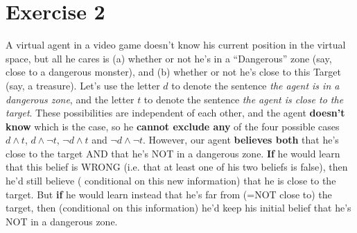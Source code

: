 \documentclass[leqno]{article}
\begin{document}
\section*{Exercise 2}

A virtual agent in a video game doesn't know his current position in the 
virtual space, but all he cares is (a) whether or not he's in a ``Dangerous''
zone (say, close to a dangerous monster), and (b) whether or not he's close to 
this Target (say, a treasure). Let's use the letter $d$ to denote the sentence 
\textit{the agent is in a dangerous zone}, and the letter $t$ to denote the 
sentence \textit{the agent is close to the target}. These possibilities are 
independent of each other, and the agent \textbf{doesn't know} which is the 
case, so he \textbf{cannot exclude any} of the four possible cases $d \land t$,
 $d \land \neg t$, $\neg d \land t$ and $\neg d \land \neg t$. However, our 
agent \textbf{believes both} that he's close to the target AND that he's NOT in
 a dangerous zone. \textbf{If} he would learn that this belief is WRONG (i.e. 
that at least one of his two beliefs is false), then he'd still believe (
conditional on this new information) that he is close to the target. But 
\textbf{if} he would learn instead that he's far from (=NOT close to) the 
target, then (conditional on this information) he'd keep his initial belief 
that he's NOT in a dangerous zone.
\end{document}
